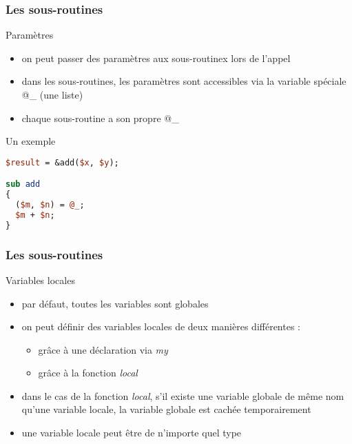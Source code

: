 \begin{frame}[fragile]
  \frametitle{Les sous-routines}

  \begin{block}{Paramètres}
    \begin{itemize}
    \item on peut passer des paramètres aux sous-routinex lors de l'appel
    \item dans les sous-routines, les paramètres sont accessibles via la
      variable spéciale @\_ (une liste)
    \item chaque sous-routine a son propre @\_
    \end{itemize}
  \end{block}

  \begin{exampleblock}{Un exemple}
    \begin{lstlisting}[language=perl]
$result = &add($x, $y);

sub add
{
  ($m, $n) = @_;
  $m + $n;
}
    \end{lstlisting}
  \end{exampleblock}
\end{frame}

\begin{frame}[fragile]
  \frametitle{Les sous-routines}

  \begin{block}{Variables locales}
    \begin{itemize}
    \item par défaut, toutes les variables sont globales
    \item on peut définir des variables locales de deux manières différentes :
      \begin{itemize}
      \item grâce à une déclaration via \textit{my}
      \item grâce à la fonction \textit{local}
      \end{itemize}
    \item dans le cas de la fonction \textit{local}, s'il existe une variable
      globale de même nom qu'une variable locale, la variable globale est cachée
      temporairement
    \item une variable locale peut être de n'importe quel type
    \end{itemize}
  \end{block}

\end{frame}

